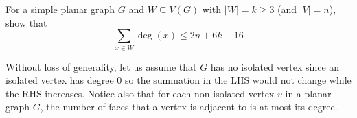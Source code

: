 \question For a simple planar graph \(G\) and \(W \subseteq
V(G)\) with \(|W| = k \geq 3\) (and \(|V|=n\)), show that
\[ \sum_{x \in W} \deg(x) \leq 2n + 6 k - 16 \]

\begin{solution}

  Without loss of generality, let us assume that \(G\) has no isolated vertex
  since an isolated vertex has degree 0 so the summation in the LHS would not
  change while the RHS increases.
  Notice also that for each non-isolated vertex \(v\) in a planar graph \(G\), 
  the number of faces that a vertex is adjacent to is at most its degree.
\end{solution}

